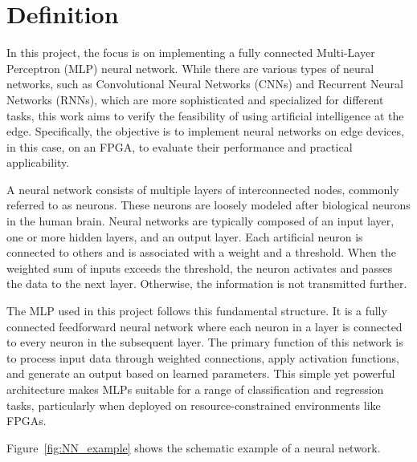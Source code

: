\documentclass[11pt]{report}
\begin{document}
\section{Definition}
\label{sec:intro}
In this project, the focus is on implementing a fully connected Multi-Layer Perceptron (MLP) neural network. While there are various types of neural networks, such as Convolutional Neural Networks (CNNs) and Recurrent Neural Networks (RNNs), which are more sophisticated and specialized for different tasks, this work aims to verify the feasibility of using artificial intelligence at the edge. Specifically, the objective is to implement neural networks on edge devices, in this case, on an FPGA, to evaluate their performance and practical applicability.

A neural network consists of multiple layers of interconnected nodes, commonly referred to as neurons. These neurons are loosely modeled after biological neurons in the human brain. Neural networks are typically composed of an input layer, one or more hidden layers, and an output layer. Each artificial neuron is connected to others and is associated with a weight and a threshold. When the weighted sum of inputs exceeds the threshold, the neuron activates and passes the data to the next layer. Otherwise, the information is not transmitted further.

The MLP used in this project follows this fundamental structure. It is a fully connected feedforward neural network where each neuron in a layer is connected to every neuron in the subsequent layer. The primary function of this network is to process input data through weighted connections, apply activation functions, and generate an output based on learned parameters. This simple yet powerful architecture makes MLPs suitable for a range of classification and regression tasks, particularly when deployed on resource-constrained environments like FPGAs.

Figure~\ref{fig:NN_example} shows the schematic example of a neural network.
\end{document}
